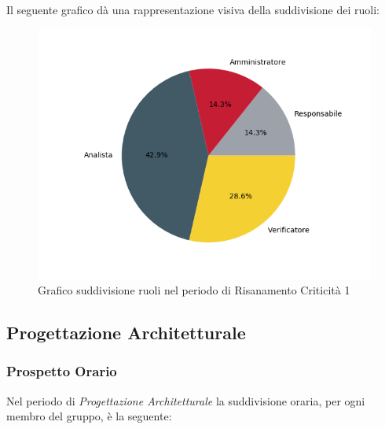 Il seguente grafico dà una rappresentazione visiva della suddivisione dei ruoli:
\begin{figure}[H]
	\centering
  		\includegraphics[width=1\linewidth]{./images/torta_rc1.png}
  		\caption{Grafico suddivisione ruoli nel periodo di Risanamento Criticità 1}
  		\label{fig:grafico suddivione ruoli periodo di rc1}
\end{figure}

\newpage
\subsection{Progettazione Architetturale}
\label{PPA}
\subsubsection{Prospetto Orario}

Nel periodo di \textit{Progettazione Architetturale} la suddivisione oraria, per ogni membro del gruppo, è la seguente:



